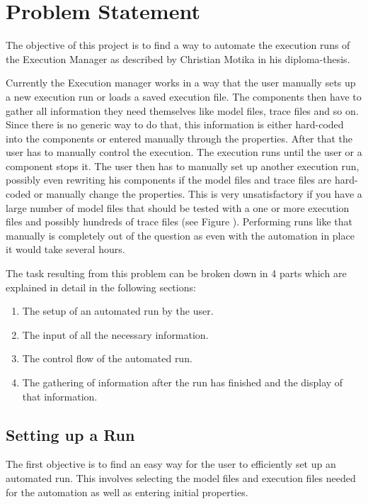 \chapter{Problem Statement}
\label{chapter:AutoTask}
The objective of this project is to find a way to automate the execution
runs of the Execution Manager as described by Christian Motika in his
diploma-thesis\cite{cmot-dt}.

Currently the Execution manager works in a way that the user manually sets up
a new execution run or loads a saved execution file. The components then have 
to gather all information they need themselves like model files, trace files and so on.
Since there is no generic way to do that, this information is either hard-coded into
the components or entered manually through the properties.
After that the user has to manually control the execution. The execution runs until
the user or a component stops it. The user then has to manually set up another
execution run, possibly even rewriting his components if the model files
and trace files are hard-coded or manually change the properties.
This is very unsatisfactory if you have a large number of model files that
should be tested with a one or more execution files and possibly hundreds of trace files
(see Figure ).
Performing runs like that manually is completely out of the question as even
with the automation in place it would take several hours.

The task resulting from this problem can be broken down in 4 parts which are explained in detail in
the following sections:
\begin{enumerate}
 \item The setup of an automated run by the user.
 \item The input of all the necessary information.
 \item The control flow of the automated run.
 \item The gathering of information after the run has finished and the display 
of that information.
\end{enumerate}

\section{Setting up a Run}
\label{section:AutoTaskSetup}
The first objective is to find an easy way for the user to efficiently set up an
automated run. This involves selecting the model files and execution files
needed for the automation as well as entering initial properties.

